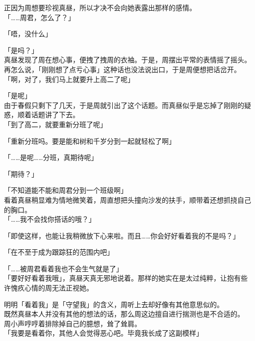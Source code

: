 正因为周想要珍视真昼，所以才决不会向她表露出那样的感情。\\

「……周君，怎么了？」

「唔，没什么」

「是吗？」\\

真昼发现了周在想心事，便拽了拽周的衣袖。于是，周摆出平常的表情摇了摇头。\\

再怎么说，「刚刚想了点亏心事」这种话也没法说出口，于是周便想把话岔开。\\

「啊，对了，我们马上就要升上高二了呢」

「是呢」\\

由于春假只剩下了几天，于是周就引出了这个话题。而真昼似乎是忘掉了刚刚的疑惑，顺着话题讲了下去。\\

「到了高二，就要重新分班了呢」

「重新分班吗。要是能和树和千岁分到一起就轻松了啊」

「……是呢……分班，真期待呢」

「期待？」

「不知道能不能和周君分到一个班级啊」\\

看着真昼稍显难为情地微笑着，周直想把头撞向沙发的扶手，顺带着还想抓挠自己的胸口。\\

「……我不会找你搭话的哦？」

「即使这样，也能让我稍微放下心来啦。而且……你会好好看着我的不是吗？」

「在不至于成为跟踪狂的范围内吧」

「……被周君看着我也不会生气就是了」\\

「要好好看着我哦」，真昼天真无邪地说着。那样的她实在是太过纯粹，让抱有些许愧疚心情的周无法正视她。

明明「看着我」是「守望我」的含义，周听上去却好像有其他意思似的。\\

既然真昼本人并没有其他的想法的话，那么周这边擅自进行揣测也是不合适的。\\

周小声哼哼着排除掉自己的臆想，耸了耸肩。\\

「我要是看着你，其他人会觉得恶心吧。毕竟我长成了这副模样」\\

